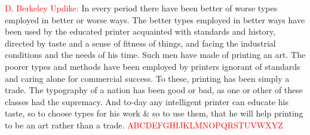 \documentclass{book}
\begin{document}
  \textcolor{red}{D. Berkeley Updike:} In every period there have been better of worse
    types employed in better or worse ways. The better types employed
    in better ways have been used by the educated printer acquainted
    with standards and history, directed by taste and a sense of
    fitness of things, and facing the industrial conditions and the
    needs of his time. Such men have made of printing an art. The
    poorer types and methods have been employed by printers ignorant
    of standards and caring alone for commercial success. To these,
    printing has been simply a trade. The typography of a nation has
    been good or bad, as one or other of these classes had the
    supremacy. And to-day any intelligent printer can educate his
    taste, so to choose types for his work \& so to use them, that he
    will help printing to be an art rather than a
    trade. \textcolor{red}{ABCDEFGHIJKLMNOPQRSTUVWXYZ}
\end{document}
